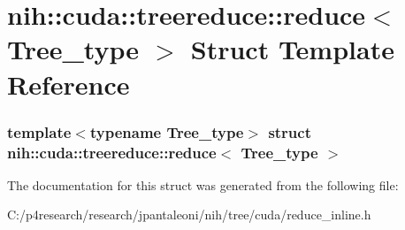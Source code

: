 \hypertarget{structnih_1_1cuda_1_1treereduce_1_1reduce}{
\section{nih\-:\-:cuda\-:\-:treereduce\-:\-:reduce$<$ \-Tree\-\_\-type $>$ \-Struct \-Template \-Reference}
\label{structnih_1_1cuda_1_1treereduce_1_1reduce}
}
\subsubsection*{template$<$typename Tree\-\_\-type$>$ struct nih\-::cuda\-::treereduce\-::reduce$<$ Tree\-\_\-type $>$}



\-The documentation for this struct was generated from the following file\-:\begin{DoxyCompactItemize}
\item 
\-C\-:/p4research/research/jpantaleoni/nih/tree/cuda/reduce\-\_\-inline.\-h\end{DoxyCompactItemize}

